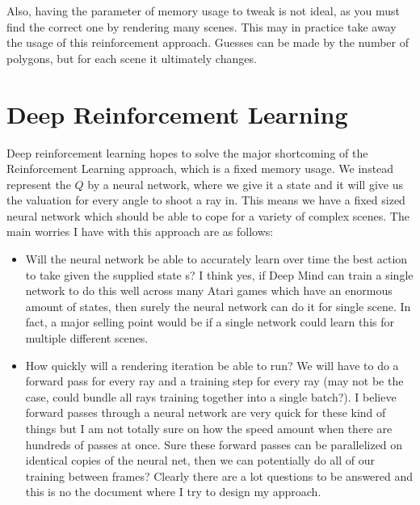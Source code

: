 \documentclass[conference]{IEEEtran}
\begin{document}
Also, having the parameter of memory usage to tweak is not ideal, as you must find the correct one by rendering many scenes. This may in practice take away the usage of this reinforcement approach. Guesses can be made by the number of polygons, but for each scene it ultimately changes. 

\section{Deep Reinforcement Learning}
Deep reinforcement learning hopes to solve the major shortcoming of the Reinforcement Learning approach, which is a fixed memory usage. We instead represent the $Q$ by a neural network, where we give it a state and it will give us the valuation for every angle to shoot a ray in. This means we have a fixed sized neural network which should be able to cope for a variety of complex scenes. The main worries I have with this approach are as follows:

\begin{itemize}
\item Will the neural network be able to accurately learn over time the best action to take given the supplied state s? I think yes, if Deep Mind can train a single network to do this well across many Atari games which have an enormous amount of states, then surely the neural network can do it for single scene. In fact, a major selling point would be if a single network could learn this for multiple different scenes.

\item How quickly will a rendering iteration be able to run? We will have to do a forward pass for every ray and a training step for every ray (may not be the case, could bundle all rays training together into a single batch?). I believe forward passes through a neural network are very quick for these kind of things but I am not totally sure on how the speed amount when there are hundreds of passes at once. Sure these forward passes can be parallelized on identical copies of the neural net, then we can potentially do all of our training between frames? Clearly there are a lot questions to be answered and this is no the document where I try to design my approach.
\end{itemize}
\end{document}
